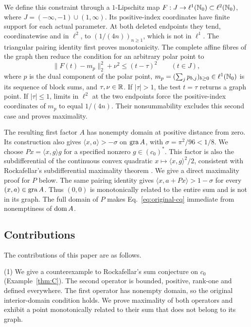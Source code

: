 We define this constraint through a $1$-Lipschitz map
$F:J\to\ell^1(\mathbb N_0)\subset\ell^2(\mathbb N_0)$, where
$J=(-\infty,-1)\cup(1,\infty)$. Its positive-index coordinates have finite
support for each actual parameter. At both deleted endpoints they tend,
coordinatewise and in $\ell^2$, to
$(1/(4n))_{n\ge1}$, which is not in $\ell^1$.
The triangular pairing identity first proves monotonicity. The complete
affine fibres of the graph then reduce the condition for an arbitrary
polar point to
\begin{equation}
\|F(t)-m_p\|_2^2+\nu^2\le(t-\tau)^2
\qquad(t\in J),
\label{eq:polar-intro}
\end{equation}
where $p$ is the dual component of the polar point,
$m_p=(\sum_j p_{b,j})_{b\ge0}\in\ell^1(\mathbb N_0)$ is its sequence of
block sums, and $\tau,\nu\in\mathbb R$. If $|\tau|>1$, the test $t=\tau$ returns a graph
point. If $|\tau|\le1$, limits in $\ell^2$ at the two endpoints
force the positive-index coordinates of $m_p$ to equal $1/(4n)$.
Their nonsummability excludes this second case and proves maximality.

The resulting first factor $A$ has nonempty domain at positive distance
from zero. Its construction also gives
$\langle x,a\rangle>-\sigma$ on $\operatorname{gra} A$, with
$\sigma=\pi^2/96<1/8$. We choose
$Px=\langle x,g\rangle g$ for a specified nonzero $g\in(c_0)^*$.
This factor is also the subdifferential of the continuous convex quadratic
$x\mapsto\langle x,g\rangle^2/2$, consistent with Rockafellar's
subdifferential maximality theorem \cite{rockafellar1970subdiff}.
We give a direct maximality proof for $P$ below.
The same pairing identity gives
$\langle x,a+Px\rangle>1-\sigma$ for every $(x,a)\in\operatorname{gra} A$.
Thus $(0,0)$ is monotonically related to the entire sum and is not in
its graph. The full domain of $P$ makes
Eq.~\eqref{eq:original-cq} immediate from nonemptiness of $\operatorname{dom} A$.

\subsection{Contributions}
The contributions of this paper are as follows.

(1) We give a counterexample to Rockafellar's sum conjecture on $c_0$
(Example~\ref{thm:C}). The second operator is bounded, positive, rank-one
and defined everywhere. The first operator has nonempty domain, so the
original interior-domain condition holds. We prove maximality of both
operators and exhibit a point monotonically related to their sum that
does not belong to its graph.

